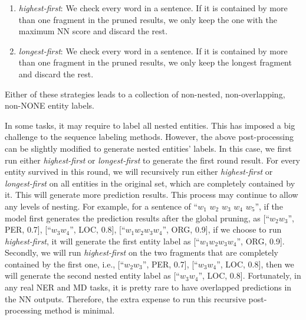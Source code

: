 \documentclass[11pt,a4paper]{article}
\begin{document}
\begin{enumerate}
	\item {\it highest-first}: We check every word in a sentence. If it is contained by more than one fragment in the pruned results, we only keep the one with the maximum NN score and discard the rest. 
	\item {\it longest-first}: We check every word in a sentence. If it is contained by more than one fragment in the pruned results, we only keep the longest fragment and discard the rest. 
\end{enumerate}
Either of these strategies leads to a collection of non-nested, non-overlapping, non-NONE entity labels.

In some tasks, it may  require to label all nested entities. This has imposed a big challenge to the sequence labeling methods. However, the above post-processing can be slightly modified to generate nested entities' labels. In this case, we first run either {\it highest-first} or {\it longest-first} to generate the first round result. For every entity survived in this round, we will recursively run either {\it highest-first} or {\it longest-first} on all entities in the original set, which are completely contained by it. This will generate more prediction results. This process may continue to allow any levels of nesting. For example, for a sentence of ``$w_1$  $w_2$ $w_3$ $w_4$ $w_5$'', 
if the model first generates the prediction results  after the global pruning, as  [``$w_2 w_3$'', PER, 0.7], [``$w_3 w_4$'', LOC, 0.8], [``$w_1 w_2 w_3 w_4$'', ORG, 0.9], if we choose to run {\it highest-first}, it will generate the first entity label as [``$w_1 w_2 w_3 w_4$'', ORG, 0.9]. Secondly, we will run {\it highest-first} on the two fragments that are completely contained by the first one, i.e.,  [``$w_2 w_3$'', PER, 0.7], [``$w_3 w_4$'', LOC, 0.8], then we will generate the second nested entity label as [``$w_3 w_4$'', LOC, 0.8].
Fortunately, in any real NER and MD tasks, it is pretty rare to have overlapped predictions in the NN outputs. Therefore, the extra expense to run this recursive post-processing method is minimal. 
\end{document}

